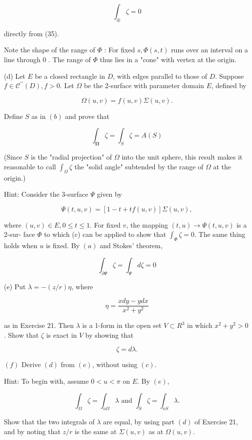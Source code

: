 \documentclass[10pt]{article}
\begin{document}
$$
\int_{\oplus} \zeta=0
$$

directly from (35).

Note the shape of the range of $\Phi$ : For fixed $s, \Phi(s, t)$ runs over an interval on a line through 0 . The range of $\Phi$ thus lies in a "cone" with vertex at the origin.

(d) Let $E$ be a closed rectangle in $D$, with edges parallel to those of $D$. Suppose $f \in \mathscr{C}^{\prime \prime}(D), f>0$. Let $\Omega$ be the 2-surface with parameter domain $E$, defined by

$$
\Omega(u, v)=f(u, v) \Sigma(u, v) .
$$

Define $S$ as in $(b)$ and prove that

$$
\int_{\mathbf{\Omega}} \zeta=\int_{S} \zeta=A(S)
$$

(Since $S$ is the "radial projection" of $\Omega$ into the unit sphere, this result makes it reasonable to call $\int_{\Omega} \zeta$ the "solid angle" subtended by the range of $\Omega$ at the origin.)

Hint: Consider the 3-surface $\Psi$ given by

$$
\Psi(t, u, v)=[1-t+t f(u, v)] \Sigma(u, v),
$$

where $(u, v) \in E, 0 \leq t \leq 1$. For fixed $v$, the mapping $(t, u) \rightarrow \Psi(t, u, v)$ is a 2-sur- face $\Phi$ to which (c) can be applied to show that $\int_{\Phi} \zeta=0$. The same thing holds when $u$ is fixed. By $(a)$ and Stokes' theorem,

$$
\int_{\partial \Psi} \zeta=\int_{\Psi} d \zeta=0
$$

(e) Put $\lambda=-(z / r) \eta$, where

$$
\eta=\frac{x d y-y d x}{x^{2}+y^{2}}
$$

as in Exercise 21. Then $\lambda$ is a 1-form in the open set $V \subset R^{3}$ in which $x^{2}+y^{2}>0$. Show that $\zeta$ is exact in $V$ by showing that

$$
\zeta=d \lambda .
$$

$(f)$ Derive $(d)$ from $(e)$, without using $(c)$.

Hint: To begin with, assume $0<u<\pi$ on $E$. By $(e)$,

$$
\int_{\Omega} \zeta=\int_{o \Omega} \lambda \text { and } \int_{S} \zeta=\int_{o S} \lambda .
$$

Show that the two integrals of $\lambda$ are equal, by using part $(d)$ of Exercise 21, and by noting that $z / r$ is the same at $\Sigma(u, v)$ as at $\Omega(u, v)$.
\end{document}
